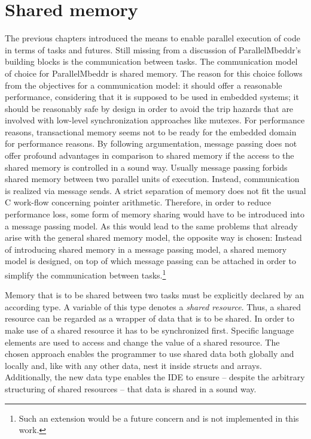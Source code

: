\section{Shared memory}
\label{sharedMemory}
The previous chapters introduced the means to enable parallel execution of code in terms of tasks and futures. Still missing from a discussion of ParallelMbeddr's building blocks is the communication between tasks. The communication model of choice for ParallelMbeddr is shared memory. The reason for this choice follows from the objectives for a communication model: it should offer a reasonable performance, considering that it is supposed to be used in embedded systems; it should be reasonably safe by design in order to avoid the trip hazards that are involved with low-level synchronization approaches like mutexes. For performance reasons, transactional memory seems not to be ready for the embedded domain for performance reasons. By following argumentation, message passing does not offer profound advantages in comparison to shared memory if the access to the shared memory is controlled in a sound way. Usually message passing forbids shared memory between two parallel units of execution. Instead, communication is realized via message sends. A strict separation of memory does not fit the usual C work-flow concerning pointer arithmetic. Therefore, in order to reduce performance loss, some form of memory sharing would have to be introduced into a message passing model. As this would lead to the same problems that already arise with the general shared memory model, the opposite way is chosen: Instead of introducing shared memory in a message passing model, a shared memory model is designed, on top of which message passing can be attached in order to simplify the communication between tasks.\footnote{Such an extension would be a future concern and is not implemented in this work.}

Memory that is to be shared between two tasks must be explicitly declared by an according type. A variable of this type denotes a \textit{shared resource}. Thus, a shared resource can be regarded as a wrapper of data that is to be shared. In order to make use of a shared resource it has to be synchronized first. Specific language elements are used to access and change the value of a shared resource. The chosen approach enables the programmer to use shared data both globally and locally and, like with any other data, nest it inside structs and arrays. Additionally, the new data type enables the IDE to ensure -- despite the arbitrary structuring of shared resources -- that data is shared in a sound way.

